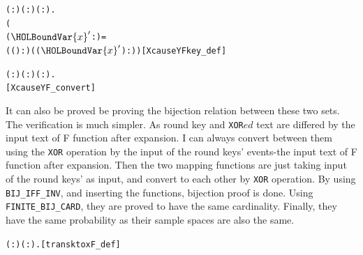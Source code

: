 \documentclass{article}
\begin{document}
\begin{alltt}
\HOLTokenTurnstile{} \HOLSymConst{\HOLTokenForall{}}( :) ( :) ( :).
         \HOLSymConst{=}
     (
        (\ensuremath{\HOLBoundVar{x}\sp{\prime{}}} :) =  \HOLSymConst{\HOLTokenEor{}}  
         
          \HOLTokenLeftbrace{} \HOLTokenBar{} ( ( \HOLSymConst{\HOLTokenEor{}} ) :) \HOLSymConst{\HOLTokenEor{}} ( (\ensuremath{\HOLBoundVar{x}\sp{\prime{}}} \HOLSymConst{\HOLTokenEor{}} ) :) \HOLSymConst{=} \HOLTokenRightbrace{})\hfill{[XcauseYFkey_def]}
\end{alltt}

\begin{alltt}
\HOLTokenTurnstile{} \HOLSymConst{\HOLTokenForall{}}( :) ( :) ( :).
         \HOLSymConst{=}   \hfill{[XcauseYF_convert]}
\end{alltt}

It can also be proved be proving the bijection relation between these two sets. The verification is much simpler.
As round key and \verb|XOR|$ed$ text are differed by the input text of F function after expansion. I can always convert between them using the
\verb|XOR| operation by the input of the round keys' events-the input text of F function after expansion. Then the two mapping functions are just
taking input of the round keys' as input, and convert to each other by \verb|XOR| operation. By using \verb|BIJ_IFF_INV|, and inserting the functions,
bijection proof is done. Using \verb|FINITE_BIJ_CARD|, they are proved to have the same cardinality. Finally, they have the same probability as
their sample spaces are also the same.

\begin{alltt}
\HOLTokenTurnstile{} \HOLSymConst{\HOLTokenForall{}}( :) ( :).    \HOLSymConst{=}  \HOLSymConst{\HOLTokenEor{}} \hfill{[transktoxF_def]}
\end{alltt}
\end{document}
